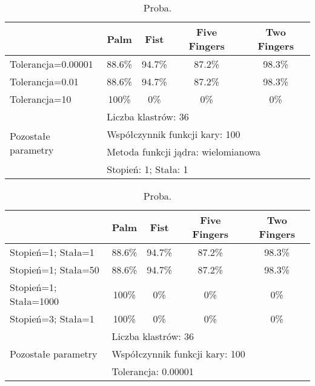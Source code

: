\begin{table}
	\centering
	\begin{tabular}{|l|c|c|c|c|}
		\hline
		 					& \textbf{Palm} & \textbf{Fist} & \textbf{Five Fingers} & \textbf{Two Fingers} \\ \hline
		Tolerancja=0.00001 	& 88.6\% 		& 94.7\%		& 87.2\%				& 98.3\% \\ \hline
		Tolerancja=0.01 	& 88.6\% 		& 94.7\%		& 87.2\%				& 98.3\% \\ \hline
		Tolerancja=10		& 100\%			& 0\%			& 0\%					& 0\% \\ \hline
		\multirow{4}{*}{Pozostałe parametry} & \multicolumn{4}{|l|}{Liczba klastrów: 36} \\ 
							& \multicolumn{4}{|l|}{Współczynnik funkcji kary: 100} \\ 
							& \multicolumn{4}{|l|}{Metoda funkcji jądra: wielomianowa} \\
							& \multicolumn{4}{|l|}{Stopień: 1; Stała: 1} \\ \hline
	\end{tabular}
	\caption{Proba.}
\end{table}


\begin{table}
	\centering
	\begin{tabular}{|l|c|c|c|c|}
		\hline
		& \textbf{Palm} & \textbf{Fist} & \textbf{Five Fingers} & \textbf{Two Fingers} \\ \hline
		Stopień=1; Stała=1 	& 88.6\% 		& 94.7\%		& 87.2\%				& 98.3\% \\ \hline
		Stopień=1; Stała=50 	& 88.6\% 		& 94.7\%		& 87.2\%				& 98.3\% \\ \hline
		Stopień=1; Stała=1000		& 100\%			& 0\%			& 0\%					& 0\% \\ \hline
		Stopień=3; Stała=1		& 100\%			& 0\%			& 0\%					& 0\% \\ \hline
		\multirow{3}{*}{Pozostałe parametry} & \multicolumn{4}{|l|}{Liczba klastrów: 36} \\ 
		& \multicolumn{4}{|l|}{Współczynnik funkcji kary: 100} \\ 
		& \multicolumn{4}{|l|}{Tolerancja: 0.00001} \\ \hline
	\end{tabular}
	\caption{Proba.}
\end{table}


